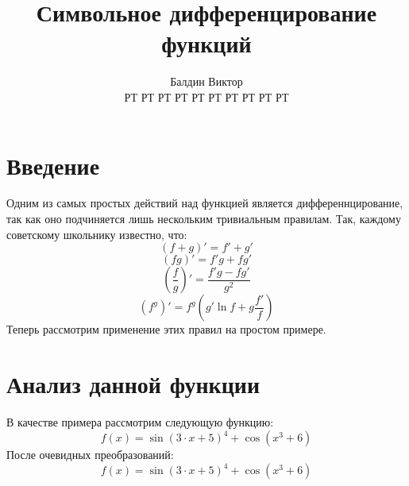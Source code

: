 \documentclass{article}
\title{Символьное дифференцирование функций}
\author{Балдин Виктор\\РТ РТ РТ РТ РТ РТ РТ РТ РТ РТ}
\begin{document}
\maketitle
\section{Введение}
Одним из самых простых действий над функцией является дифференнцирование, так как оно подчиняется лишь нескольким тривиальным правилам. Так, каждому советскому школьнику известно, что:
$$(f+g)'=f'+g'$$
$$(fg)' =f'g+fg'$$
$$\left(\frac{f}{g}\right)'=\frac{f'g-fg'}{g^2}$$
$$(f^g)'=f^g\left(g'\ln f+g\frac{f'}{f}\right)$$Теперь рассмотрим применение этих правил на простом примере.\section{Анализ данной функции}
В качестве примера рассмотрим следующую функцию:
$$f(x)=\sin \left(3 \cdot x+5\right)^{4}+\cos\left(x^{3}+6\right)$$
После очевидных преобразований:$$f(x)=\sin \left(3 \cdot x+5\right)^{4}+\cos\left(x^{3}+6\right)$$
\end{document}
